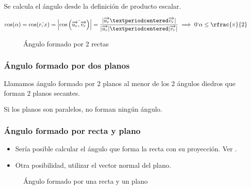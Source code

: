 Se calcula el ángulo desde la definición de producto escalar.

\[
\cos(\alpha) = \cos(\hat{r,x}) = \left| \cos\left(\hat{\vec{u_r},\vec{v_r}}\right)\right| = \frac{|\vec{u_r}·\vec{v_r}|}{|\vec{u_r}|·|\vec{v_r}|} \implies 0\lq \alpha \leq \rfrac{\pi}{2}
\]


\begin{figure}[hbtp]
\centering
{}

\label{fig::ang-recta-recta}
\caption{Ángulo formado por 2 rectas}
\end{figure}


\subsubsection{Ángulo formado por dos planos}

Llamamos ángulo formado por 2 planos al menor de los 2 ángulos diedros que forman 2 planos secantes.

\obs Si los planos son paralelos, no forman ningún ángulo.


\subsubsection{Ángulo formado por recta y plano}


\begin{itemize}
  \item Sería posible calcular el ángulo que forma la recta con su proyección. Ver .
  \item Otra posibilidad, utilizar el vector normal del plano.
\end{itemize}


\begin{figure}[hbtp]
\centering
{}

\label{fig::ang-recta-plano}
\caption{Ángulo formado por una recta y un plano}
\end{figure}

